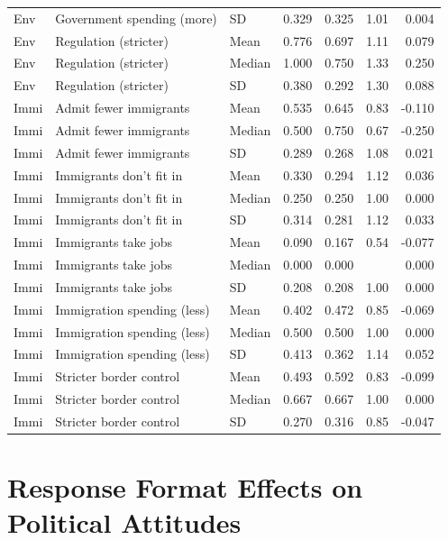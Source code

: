 \begin{table}[H]
\begin{tabular}{lllrrrr}
  Env & Government spending (more) & SD & 0.329 & 0.325 & 1.01 & 0.004 \\ 
  Env & Regulation (stricter) & Mean & 0.776 & 0.697 & 1.11 & 0.079 \\ 
  Env & Regulation (stricter) & Median & 1.000 & 0.750 & 1.33 & 0.250 \\ 
  Env & Regulation (stricter) & SD & 0.380 & 0.292 & 1.30 & 0.088 \\ 
  Immi & Admit fewer immigrants & Mean & 0.535 & 0.645 & 0.83 & -0.110 \\ 
  Immi & Admit fewer immigrants & Median & 0.500 & 0.750 & 0.67 & -0.250 \\ 
  Immi & Admit fewer immigrants & SD & 0.289 & 0.268 & 1.08 & 0.021 \\ 
  Immi & Immigrants don't fit in & Mean & 0.330 & 0.294 & 1.12 & 0.036 \\ 
  Immi & Immigrants don't fit in & Median & 0.250 & 0.250 & 1.00 & 0.000 \\ 
  Immi & Immigrants don't fit in & SD & 0.314 & 0.281 & 1.12 & 0.033 \\ 
  Immi & Immigrants take jobs & Mean & 0.090 & 0.167 & 0.54 & -0.077 \\ 
  Immi & Immigrants take jobs & Median & 0.000 & 0.000 &  & 0.000 \\ 
  Immi & Immigrants take jobs & SD & 0.208 & 0.208 & 1.00 & 0.000 \\ 
  Immi & Immigration spending (less) & Mean & 0.402 & 0.472 & 0.85 & -0.069 \\ 
  Immi & Immigration spending (less) & Median & 0.500 & 0.500 & 1.00 & 0.000 \\ 
  Immi & Immigration spending (less) & SD & 0.413 & 0.362 & 1.14 & 0.052 \\ 
  Immi & Stricter border control & Mean & 0.493 & 0.592 & 0.83 & -0.099 \\ 
  Immi & Stricter border control & Median & 0.667 & 0.667 & 1.00 & 0.000 \\ 
  Immi & Stricter border control & SD & 0.270 & 0.316 & 0.85 & -0.047 \\ 
   \bottomrule
\end{tabular}
\endgroup
\end{table}

\clearpage

\section{Response Format Effects on Political Attitudes}
\label{appendix-descriptive-effects}

